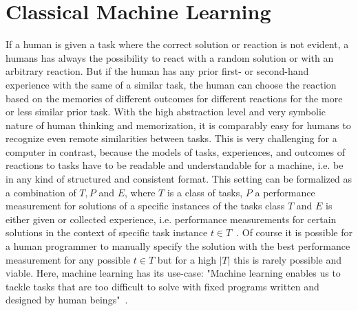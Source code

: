 \section{Classical Machine Learning}
\label{sec:theory:ml}
If a human is given a task where the correct solution or reaction is not evident, a humans has always the possibility to react with a random solution or with an arbitrary reaction.
But if the human has any prior first- or second-hand experience with the same of a similar task, the human can choose the reaction based on the memories of different outcomes for different reactions for the more or less similar prior task.
With the high abstraction level and very symbolic nature of human thinking and memorization, it is comparably easy for humans to recognize even remote similarities between tasks.\newline
This is very challenging for a computer in contrast, because the models of tasks, experiences, and outcomes of reactions to tasks have to be readable and understandable for a machine, i.e. be in any kind of structured and consistent format.
This setting can be formalized as a combination of $T, P$ and $E$, where $T$ is a class of tasks, $P$ a performance measurement for solutions of a specific instances of the tasks class $T$ and $E$ is either given or collected experience, i.e. performance measurements for certain solutions in the context of specific task instance $t\in T$~\cite{Mitchell-MachineLearning}.\newline
Of course it is possible for a human programmer to manually specify the solution with the best performance measurement for any possible $t\in T$ but for a high $|T|$ this is rarely possible and viable.
Here, machine learning has its use-case: "Machine learning enables us to tackle tasks that are too difficult to solve with fixed programs written and designed by human beings"~\cite{Goodfellow-DeepLearning}.

